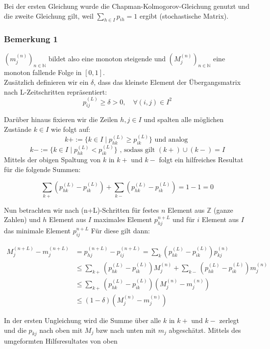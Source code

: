 \documentclass[a4paper]{article}
\begin{document}
Bei der ersten Gleichung wurde die Chapman-Kolmogorov-Gleichung genutzt und die zweite
Gleichung gilt, weil
$\sum_{h\in I} p_{ih} = 1$
ergibt (stochastische Matrix).

\subsubsection{Bemerkung 1}
$(m_j ^{(n)})_{n\in \mathbb{N}}$ bildet also eine monoton steigende und 
$(M_j ^{(n)})_{n \in \mathbb{N}}$
eine monoton fallende Folge in
$[0,1]$.
\\

Zusätzlich definieren wir ein $\delta$, dass das kleinste Element der Übergangsmatrix nach L-Zeitschritten
repräsentiert:
\[
p_{ij} ^{(L)} \geq \delta > 0, \quad
\forall (i, j) \in I^2
\] 

Darüber hinaus fixieren wir die Zeilen $h, j \in I$ und spalten alle
möglichen Zustände $k \in I$ wie folgt auf:
\[
k+ := \{
	k\in I \; \vert \; p_{hk} ^{(L)} \geq p_{ik} ^{(L)}
\} 
	\text{ und analog }
\] 
\[
k- := \{
	k\in I \; \vert \; p_{hk} ^{(L)} < p_{ik} ^{(L)}
\} \text{ , sodass gilt } (k+) \cup (k-) = I
\] 
Mittels der obigen Spaltung von $k$ in $k+$ und $k-$ folgt ein hilfreiches Resultat für die folgende Summen:

\[
\sum_{k+} \left(
	p_{hk} ^{(L)} - p_{ik} ^{(L)}
\right) + \sum_{k-} \left(
	p_{hk} ^{(L)} - p_{ik} ^{(L)}
\right) = 1 - 1 = 0
\] 

Nun betrachten wir nach (n+L)-Schritten für festes $n$ Element aus $\mathbb{Z}$ (ganze Zahlen) und $h$ Element
aus $I$ maximales Element $p_{hj} ^{n+L}$ und für $i$ Element aus $I$ das minimale Element $p_{ij} ^{n+L}$
Für diese gilt dann:

\begin{align*}
	M_j ^{(n+L)} - m_j ^{(n+L)} &= p_{hj} ^{(n+L)} - p_{ij} ^{(n+L)}
	= \sum_{k} \left(
		p_{hk} ^{(L)} - p_{ik} ^{(L)}
	\right) p_{kj} ^{(n)} \\
		& \leq \sum_{k+} \left(
			p_{hk} ^{(L)} - p_{ik} ^{(L)}
		\right) M_j ^{(n)} + \sum_{k-} \left(
			p_{hk} ^{(L)} - p_{ik} ^{(L)}
		\right) m_j ^{(n)} \\
		& \leq \sum_{k+} \left(
			p_{hk} ^{(L)} - p_{ik} ^{(L)}
		\right) \left(
			M_j ^{(n)} - m_j ^{(n)}
		\right) \\
		& \leq \left(
			1- \delta
		\right) \left(
			M_j ^{(n)} - m_j ^{(n)}
		\right) 
\end{align*}

In der ersten Ungleichung wird die Summe über alle $k$ in $k+$ und $k-$ zerlegt und die $p_{ kj }$ nach oben mit
$M_j$ bzw nach unten mit $m_j$ abgeschätzt. Mittels des umgeformten Hilfsresultates von oben
\end{document}
